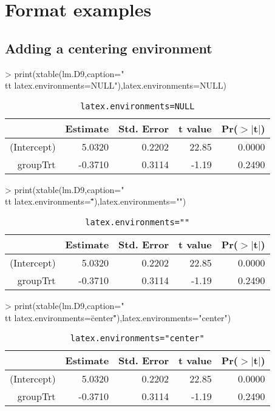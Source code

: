 \documentclass[letterpaper]{article}
\begin{document}
\section{Format examples}
\subsection{Adding a centering environment }
\begin{Schunk}
\begin{Sinput}
>    print(xtable(lm.D9,caption="\\tt latex.environments=NULL"),latex.environments=NULL)
\end{Sinput}
% latex table generated in R 3.1.1 by xtable 1.7-3 package
% 
\begin{table}[ht]
\begin{tabular}{rrrrr}
  \hline
 & Estimate & Std. Error & t value & Pr($>$$|$t$|$) \\ 
  \hline
(Intercept) & 5.0320 & 0.2202 & 22.85 & 0.0000 \\ 
  groupTrt & -0.3710 & 0.3114 & -1.19 & 0.2490 \\ 
   \hline
\end{tabular}
\caption{\tt latex.environments=NULL} 
\end{table}\begin{Sinput}
>     print(xtable(lm.D9,caption="\\tt latex.environments=\"\""),latex.environments="")
\end{Sinput}
% latex table generated in R 3.1.1 by xtable 1.7-3 package
% 
\begin{table}[ht]
\begin{tabular}{rrrrr}
  \hline
 & Estimate & Std. Error & t value & Pr($>$$|$t$|$) \\ 
  \hline
(Intercept) & 5.0320 & 0.2202 & 22.85 & 0.0000 \\ 
  groupTrt & -0.3710 & 0.3114 & -1.19 & 0.2490 \\ 
   \hline
\end{tabular}
\caption{\tt latex.environments=""} 
\end{table}\begin{Sinput}
>     print(xtable(lm.D9,caption="\\tt latex.environments=\"center\""),latex.environments="center")
\end{Sinput}
% latex table generated in R 3.1.1 by xtable 1.7-3 package
% 
\begin{table}[ht]
\centering
\begin{tabular}{rrrrr}
  \hline
 & Estimate & Std. Error & t value & Pr($>$$|$t$|$) \\ 
  \hline
(Intercept) & 5.0320 & 0.2202 & 22.85 & 0.0000 \\ 
  groupTrt & -0.3710 & 0.3114 & -1.19 & 0.2490 \\ 
   \hline
\end{tabular}
\caption{\tt latex.environments="center"} 
\end{table}\end{Schunk}
\end{document}
